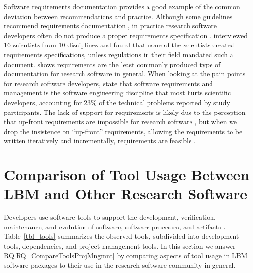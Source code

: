 \documentclass[final, 3p, times, authoryear]{elsarticle}
\newcommand{\rqref}[1]{RQ\ref{#1}}
\begin{document}
Software requirements documentation provides a good example of the common
deviation between recommendations and practice.  Although some guidelines
recommend requirements documentation \citep{TobiasEtAl2018, HerouxEtAl2008,
SmithAndKoothoor2016}, in practice research software developers often do not
produce a proper requirements specification \citep{HeatonAndCarver2015}.
\citet{SandersAndKelly2008} interviewed 16 scientists from 10 disciplines and
found that none of the scientists created requirements specifications, unless
regulations in their field mandated such a document. \citet{Nguyen-HoanEtAl2010}
shows requirements are the least commonly produced type of documentation for
research software in general. When looking at the pain points for research
software developers, \citet{WieseEtAl2019} state that software requirements and
management is the software engineering discipline that most hurts scientific
developers, accounting for 23\% of the technical problems reported by study
participants.  The lack of support for requirements is likely due to the
perception that up-front requirements are impossible for research software
\citep{CarverEtAl2007, SegalAndMorris2008}, but when we drop the insistence on
``up-front'' requirements, allowing the requirements to be written
iteratively and incrementally, requirements are feasible \citep{Smith2016}.

\section{Comparison of Tool Usage Between LBM and Other Research Software}
\label{Sec_CompareTools}

Developers use software tools to support the development, verification,
maintenance, and evolution of software, software processes, and artifacts
\citep[p.\ 501]{GhezziEtAl2003}. Table~\ref{tbl_tools} summarizes the observed
tools, subdivided into development tools, dependencies, and project management
tools. In this section we answer \rqref{RQ_CompareToolsProjMngmnt} by comparing
aspects of tool usage in LBM software packages to their use in the research
software community in general.
\end{document}

